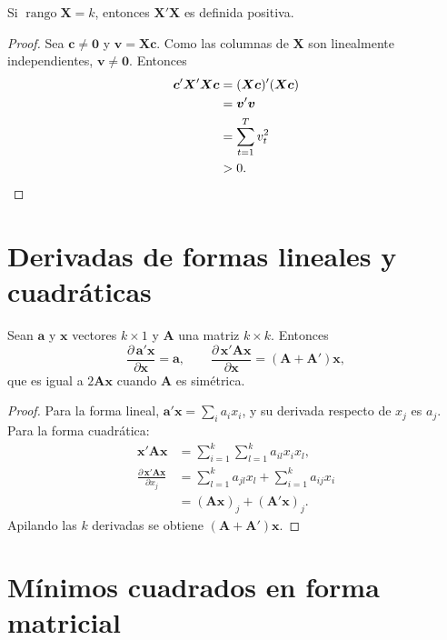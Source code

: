 \begin{proposicion}\label{prop:ap-xx}
Si $\operatorname{rango}\bm X=k$, entonces $\bm X'\bm X$ es definida positiva.
\end{proposicion}

\begin{proof}
Sea $\bm c\ne\bm0$ y $\bm v=\bm X\bm c$. Como las columnas de $\bm X$ son linealmente independientes,
$\bm v\ne\bm0$. Entonces
\begin{align*}
  \bm c'\bm X'\bm X\bm c &= (\bm X\bm c)'(\bm X\bm c)\\
                         &= \bm v'\bm v\\
                         &= \sum_{t=1}^Tv_t^2\\
                         &> 0. \qedhere
\end{align*}
\end{proof}

\section{Derivadas de formas lineales y cuadráticas}

\begin{proposicion}\label{prop:ap-deriv}
Sean $\bm a$ y $\bm x$ vectores $k\times1$ y $\bm A$ una matriz $k\times k$. Entonces
\[
  \frac{\partial\,\bm a'\bm x}{\partial\bm x}=\bm a,\qquad
  \frac{\partial\,\bm x'\bm A\bm x}{\partial\bm x}=(\bm A+\bm A')\bm x,
\]
que es igual a $2\bm A\bm x$ cuando $\bm A$ es simétrica.
\end{proposicion}

\begin{proof}
Para la forma lineal, $\bm a'\bm x=\sum_ia_ix_i$, y su derivada respecto de $x_j$ es $a_j$. Para la
forma cuadrática:
\begin{align*}
  \bm x'\bm A\bm x &= \sum_{i=1}^k\sum_{l=1}^k a_{il}x_ix_l,\\
  \frac{\partial\,\bm x'\bm A\bm x}{\partial x_j} &= \sum_{l=1}^ka_{jl}x_l+\sum_{i=1}^ka_{ij}x_i\\
                                                   &= (\bm A\bm x)_j+(\bm A'\bm x)_j .
\end{align*}
Apilando las $k$ derivadas se obtiene $(\bm A+\bm A')\bm x$.
\end{proof}

\section{Mínimos cuadrados en forma matricial}

